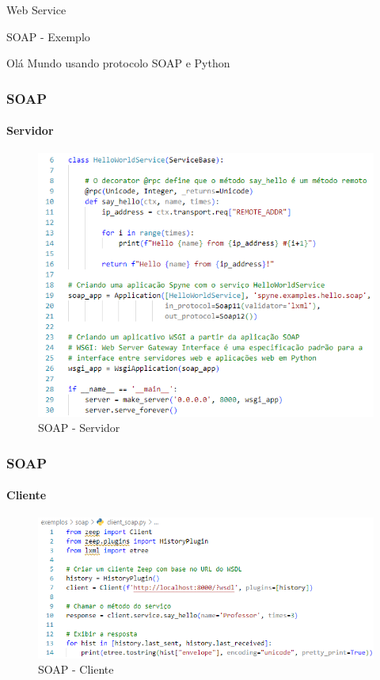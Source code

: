\documentclass[
	9pt, %
	t, %
]{beamer}
\begin{document}
\begin{frame}
	\begin{center}

		\bigskip\bigskip\bigskip\bigskip %
		{\Large Web Service}

		\bigskip\bigskip %
		{\Huge SOAP - Exemplo}

		\smallskip
		{\small Olá Mundo usando protocolo SOAP e Python}
	\end{center}

\end{frame}

\begin{frame}[fragile]
	\frametitle{SOAP}
	\framesubtitle{Servidor}

	\begin{figure}
		\includegraphics[width=0.7\linewidth]{server_soap.PNG}
		\caption{SOAP - Servidor}
		\label{fig:soap_server}
	\end{figure}

\end{frame}

\begin{frame}[fragile]
	\frametitle{SOAP}
	\framesubtitle{Cliente}

	\begin{figure}
		\includegraphics[width=0.9\linewidth]{client_soap.PNG}
		\caption{SOAP - Cliente}
		\label{fig:soap_client}
	\end{figure}

\end{frame}
\end{document}
